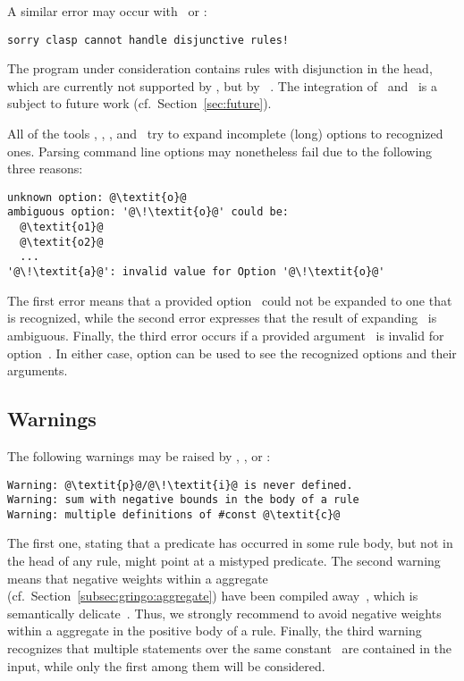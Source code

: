 A similar error may occur with \clingo\ or \iclingo:
%
\begin{lstlisting}[numbers=none,escapechar=@]
sorry clasp cannot handle disjunctive rules!
\end{lstlisting}
%
The program under consideration contains rules with disjunction in the head,
which are currently not supported by \clasp,
but by \claspD~\cite{drgegrkakoossc08a}.
The integration of \clasp\ and \claspD\ is a subject to future work
(cf.\ Section~\ref{sec:future}).

All of the tools \gringo, \clasp, \clingo, and \iclingo\
try to expand incomplete (long) options to recognized ones.
Parsing command line options may nonetheless fail due to the following three reasons:
%
\begin{lstlisting}[numbers=none,escapechar=@]
unknown option: @\textit{o}@
ambiguous option: '@\!\textit{o}@' could be:
  @\textit{o1}@
  @\textit{o2}@
  ...
'@\!\textit{a}@': invalid value for Option '@\!\textit{o}@'
\end{lstlisting}
%
The first error means that a provided option~
could not be expanded to one that is recognized,
while the second error expresses that the result of expanding~
is ambiguous.
Finally, the third error occurs if a provided argument~
is invalid for option~\code{\textit{o}}.
In either case, option  can be used to see 
the recognized options and their arguments.


\subsection{Warnings}\label{subsec:warn}

The following warnings may be raised by \gringo, \clingo, or \iclingo:
%
\begin{lstlisting}[numbers=none,escapechar=@]
Warning: @\textit{p}@/@\!\textit{i}@ is never defined.
Warning: sum with negative bounds in the body of a rule
Warning: multiple definitions of #const @\textit{c}@
\end{lstlisting}
%
The first one, stating that a predicate 
has occurred in some rule body, but not in the head of any rule,
might point at a mistyped predicate.
The second warning means that negative weights within a  aggregate
(cf.\ Section~\ref{subsec:gringo:aggregate})
have been compiled away~\cite{siniso02a},
which is semantically delicate~\cite{ferraris05a}.
Thus, we strongly recommend to avoid negative weights
within a  aggregate in the positive body of a rule.
Finally, the third warning recognizes that multiple 
statements over the same constant~\code{\textit{c}} are contained in the input,
while only the first among them will be considered.

